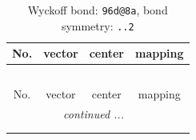 \documentclass[fleqn,8pt]{jsarticle}
\begin{document}
\renewcommand{\arraystretch}{1.2}
\begin{longtable}{cccc}
\caption{Wyckoff bond: {\tt 96d@8a}, bond symmetry: {\tt ..2}}
 \\
 \hline \hline
No. & vector & center & mapping \\ \hline \endfirsthead

\multicolumn{3}{l}{\tablename\ \thetable{}} \\
 \hline \hline
No. & vector & center & mapping \\ \hline \endhead

 \hline \hline
\multicolumn{3}{r}{\footnotesize\it continued ...} \\ \endfoot

 \hline \hline
\multicolumn{3}{r}{} \\ \endlastfoot


\end{longtable}
\end{document}
